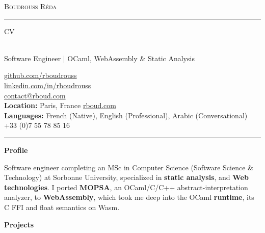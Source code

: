 \documentclass[10pt,A4]{article}
\newcommand{\cvsection}[1]
{
	\begin{center}
		\large\textcolor{sectcol}{\textbf{#1}}
	\end{center}
}
\newcommand{\metasection}[2]
{
\footnotesize{#2} \hspace*{\fill} \footnotesize{#1}\\[1pt]
}
\begin{document}
\pagestyle{fancy}


\vspace{-8pt}
\begin{center}
    {\HUGE \textsc{Boudrouss Réda} \textcolor{sectcol}{\rule[-1mm]{1mm}{0.9cm}} \textsc{CV}}\\[2pt]
    {\small Software Engineer | OCaml, WebAssembly \& Static Analysis}
\end{center}

\vspace{6pt}

\metasection{\href{https://github.com/rboudrouss}{github.com/rboudrouss}}{}
\metasection{\href{https://www.linkedin.com/in/rboudrouss}{linkedin.com/in/rboudrouss}}{}
\metasection{\href{mailto:contact@rboud.com}{contact@rboud.com}}{}
\metasection{\href{https://rboud.com}{rboud.com}}{\textbf{Location:} Paris, France}
\metasection{+33 (0)7 55 78 85 16}{\textbf{Languages:} French (Native), English (Professional), Arabic (Conversational)}

\vspace{-15pt}
\textcolor{softcol}{\hrule}

\normalsize

\cvsection{Profile}
Software engineer completing an MSc in Computer Science (Software Science \& Technology) at Sorbonne University, specialized in \textbf{static analysis}, and \textbf{Web technologies}. I ported \textbf{MOPSA}, an OCaml/C/C++ abstract-interpretation analyzer, to \textbf{WebAssembly}, which took me deep into the OCaml \textbf{runtime}, its C FFI and float semantics on Wasm.

\cvsection{Projects}
\end{document}
